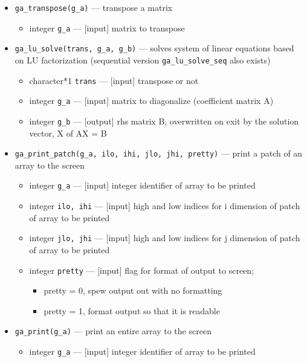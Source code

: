 \begin{itemize}
\item {\tt ga\_transpose(g\_a)} --- transpose a matrix
\begin{itemize}
\item      integer {\tt g\_a}            --- [input] matrix to transpose 
\end{itemize}

\item {\tt ga\_lu\_solve(trans, g\_a, g\_b)} --- solves system of linear equations based
  on LU factorization (sequential version \verb+ga_lu_solve_seq+ also exists)
\begin{itemize}
\item      character*1 {\tt trans}       --- [input] transpose or not
\item      integer {\tt g\_a}            --- [input] matrix to diagonalize (coefficient matrix A)
\item      integer {\tt g\_b}            --- [output] rhs matrix B, overwritten on exit
                                        by the solution vector, X of AX = B
\end{itemize}

\item {\tt ga\_print\_patch(g\_a, ilo, ihi, jlo, jhi, pretty)} --- print a patch of an array to the
  screen
\begin{itemize}
\item      integer {\tt g\_a}           --- [input] integer identifier of array to be printed
\item      integer {\tt ilo, ihi}       --- [input] high and low indices for i dimension of patch
                                               of array to be printed
\item      integer {\tt jlo, jhi}       --- [input] high and low indices for j dimension of patch
                                               of array to be printed
\item      integer {\tt pretty}         --- [input] flag for format of output to screen;
\begin{itemize}
\item pretty = 0, spew output out with no formatting
\item pretty = 1, format output so that it is readable
\end{itemize}
\end{itemize}

\item {\tt ga\_print(g\_a)} --- print an entire array to the screen
\begin{itemize}
\item      integer {\tt g\_a}           --- [input] integer identifier of array to be printed
\end{itemize}


\end{itemize}

